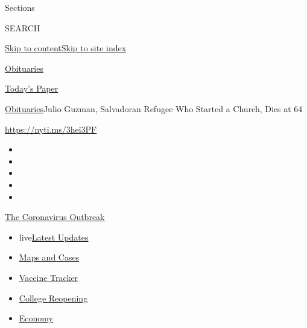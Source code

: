 Sections

SEARCH

\protect\hyperlink{site-content}{Skip to
content}\protect\hyperlink{site-index}{Skip to site index}

\href{https://www.nytimes.com/section/obituaries}{Obituaries}

\href{https://myaccount.nytimes.com/auth/login?response_type=cookie\&client_id=vi}{}

\href{https://www.nytimes.com/section/todayspaper}{Today's Paper}

\href{/section/obituaries}{Obituaries}\textbar{}Julio Guzman, Salvadoran
Refugee Who Started a Church, Dies at 64

\url{https://nyti.ms/3hei3PF}

\begin{itemize}
\item
\item
\item
\item
\item
\end{itemize}

\href{https://www.nytimes.com/news-event/coronavirus?action=click\&pgtype=Article\&state=default\&region=TOP_BANNER\&context=storylines_menu}{The
Coronavirus Outbreak}

\begin{itemize}
\tightlist
\item
  live\href{https://www.nytimes.com/2020/08/03/world/coronavirus-covid-19.html?action=click\&pgtype=Article\&state=default\&region=TOP_BANNER\&context=storylines_menu}{Latest
  Updates}
\item
  \href{https://www.nytimes.com/interactive/2020/us/coronavirus-us-cases.html?action=click\&pgtype=Article\&state=default\&region=TOP_BANNER\&context=storylines_menu}{Maps
  and Cases}
\item
  \href{https://www.nytimes.com/interactive/2020/science/coronavirus-vaccine-tracker.html?action=click\&pgtype=Article\&state=default\&region=TOP_BANNER\&context=storylines_menu}{Vaccine
  Tracker}
\item
  \href{https://www.nytimes.com/2020/08/02/us/covid-college-reopening.html?action=click\&pgtype=Article\&state=default\&region=TOP_BANNER\&context=storylines_menu}{College
  Reopening}
\item
  \href{https://www.nytimes.com/live/2020/08/03/business/stock-market-today-coronavirus?action=click\&pgtype=Article\&state=default\&region=TOP_BANNER\&context=storylines_menu}{Economy}
\end{itemize}

